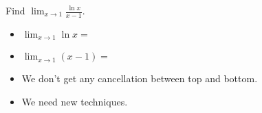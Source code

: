 \begin{frame}
\begin{example}
Find $\lim_{x\rightarrow 1}\frac{\ln x}{x - 1}$.
\begin{itemize}
\item<2-| alert@3-4>  $\lim_{x\rightarrow 1} \ln x = $ 
\item<2-| alert@5-6>  $\lim_{x\rightarrow 1} (x - 1) = $ 
\item<7->  We don't get any cancellation between top and bottom.
\item<8->  We need new techniques.
\end{itemize}
\end{example}
\end{frame}

